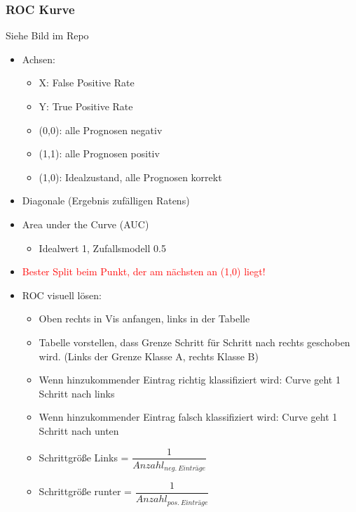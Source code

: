 \documentclass[a4paper]{article}
\begin{document}
\begin{landscape}
\begin{multicols}{3}
        \subsubsection{ROC Kurve}
        Siehe Bild im Repo
        \begin{itemize}[noitemsep,nolistsep]
            \item Achsen:
                \begin{itemize}[noitemsep,nolistsep]
                    \item X: False Positive Rate
                    \item Y: True Positive Rate
                    \item (0,0): alle Prognosen negativ
                    \item (1,1): alle Prognosen positiv 
                    \item (1,0): Idealzustand, alle Prognosen korrekt
                \end{itemize}
            \item Diagonale (Ergebnis zufälligen Ratens)
            \item Area under the Curve (AUC)
                \begin{itemize}[noitemsep,nolistsep]
                    \item Idealwert 1, Zufallsmodell 0.5
                \end{itemize}
            \item \textcolor{red}{Bester Split beim Punkt, der am nächsten an (1,0) liegt!}
            \item ROC visuell lösen:
                \begin{itemize}[noitemsep,nolistsep]
                    \item Oben rechts in Vis anfangen, links in der Tabelle
                    \item Tabelle vorstellen, dass Grenze Schritt für Schritt nach rechts geschoben wird. (Links der Grenze Klasse A, rechts Klasse B)
                    \item Wenn hinzukommender Eintrag richtig klassifiziert wird: Curve geht 1 Schritt nach links
                    \item Wenn hinzukommender Eintrag falsch klassifiziert wird: Curve geht 1 Schritt nach unten
                    \item Schrittgröße Links  = $\dfrac{1}{Anzahl_{neg.\:Einträge}}$
                    \item Schrittgröße runter  = $\dfrac{1}{Anzahl_{pos.\:Einträge}}$

\end{itemize}
\end{itemize}
\end{multicols}
\end{landscape}
\end{document}
